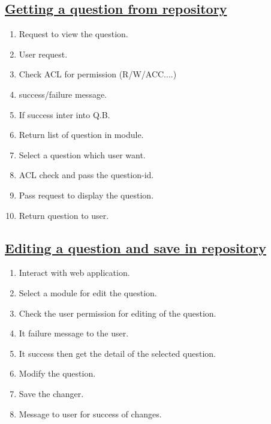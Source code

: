\documentclass{article}
\begin{document}
\subsection*{\underline{Getting a question from repository}}
\begin{enumerate}
\item Request to view the question. 
\item User request. 
\item Check ACL for permission (R/W/ACC....) 
\item success/failure message. 
\item If success inter into Q.B. 
\item Return list of question in module. 
\item Select a question which user want. 
\item ACL check and pass the question-id. 
\item Pass request to display the question. 
\item Return question to user.

\begin{center}

\label{figure:GETTING A QUESTION FROM REPOSITORY}
\end{center}
\end{enumerate}

\subsection*{\underline{Editing a question and save in repository}}
\begin{enumerate}
\item Interact with web application. 
\item Select a module for edit the question. 
\item Check the user permission for editing of the question. 
\item It failure message to the user. 
\item It success then get the detail of the selected question. 
\item Modify the question. 
\item Save the changer. 
\item Message to user for success of changes.

\begin{center}

\label{figure:EDITING A QUESTION AND SAVE IN REPOSITORY}
\end{center}
 \end{enumerate}
\end{document}
